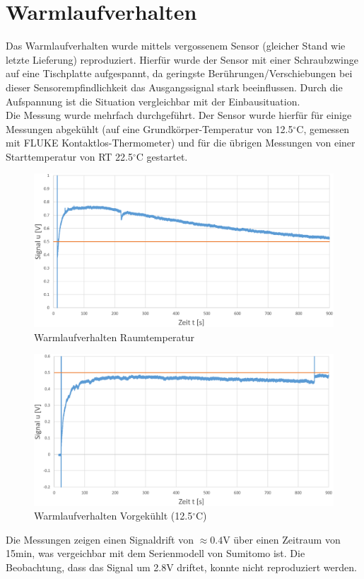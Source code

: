\documentclass[12pt,a4paper]{article}
\begin{document}
	\section{Warmlaufverhalten}
	Das Warmlaufverhalten wurde mittels vergossenem Sensor (gleicher Stand wie letzte Lieferung) reproduziert. Hierfür wurde der Sensor mit einer Schraubzwinge auf eine Tischplatte aufgespannt, da geringste Berührungen/Verschiebungen bei dieser Sensorempfindlichkeit das Ausgangssignal stark beeinflussen. Durch die Aufspannung ist die Situation vergleichbar mit der Einbausituation.\\
	Die Messung wurde mehrfach durchgeführt. Der Sensor wurde hierfür für einige Messungen abgekühlt (auf eine Grundkörper-Temperatur von 12.5$^\circ$C, gemessen mit FLUKE Kontaktlos-Thermometer) und für die übrigen Messungen von einer Starttemperatur von RT 22.5$^\circ$C gestartet.
	\begin{figure}[H]
		\centering
		\includegraphics[width=.8\linewidth]{Bilder/warmup001}
		\caption[Warmlaufverhalten Raumtemperatur]{Warmlaufverhalten Raumtemperatur}
		\label{fig:warmup001}
	\end{figure}
	\begin{figure}[H]
		\centering
		\includegraphics[width=.8\linewidth]{Bilder/warmup002}
		\caption[Warmlaufverhalten Vorgekühlt (12.5$^{\circ}$C)]{Warmlaufverhalten Vorgekühlt (12.5$^{\circ}$C)}
		\label{fig:warmup002}
	\end{figure}\noindent
	Die Messungen zeigen einen Signaldrift von $\approx 0.4$V über einen Zeitraum von 15min, was vergeichbar mit dem Serienmodell von Sumitomo ist. Die Beobachtung, dass das Signal um 2.8V driftet, konnte nicht reproduziert werden.
\end{document}
